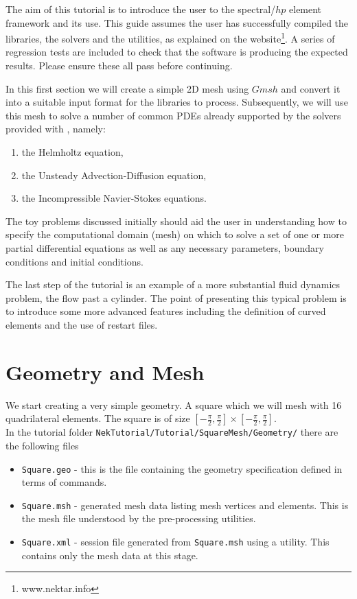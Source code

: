 \documentclass[a4paper,12pt]{article}
\begin{document}
\maketitle

The aim of this tutorial is to introduce the user to the spectral/$hp$
element framework \nektar and its use. This guide assumes
the user has successfully compiled the libraries, the solvers and the utilities,
as explained on the website\footnote{www.nektar.info}. A series of regression
tests are included to check that the software is producing the expected results.
Please ensure these all pass before continuing.
\bigskip

In this first section we will create a simple 2D mesh using $Gmsh$ and
convert it into a suitable input format for the \nektar
libraries to process. Subsequently, we will use this mesh to solve a number of
common PDEs already supported by the solvers provided with \nektar, namely:
\begin{enumerate}
\item the Helmholtz equation,
\item the Unsteady Advection-Diffusion equation,
\item the Incompressible Navier-Stokes equations. 
\end{enumerate}

The toy problems discussed initially should aid the user in understanding how to
specify the computational domain (mesh) on which to solve a set of one or more
partial differential equations as well as any necessary parameters, boundary
conditions and initial conditions.

The last step of the tutorial is an example of a more substantial fluid
dynamics problem, the flow past a cylinder. The point of presenting this typical
problem is to introduce some more advanced features including the definition of
curved elements and the use of restart files.


\section{Geometry and Mesh}

We start creating a very simple geometry. A square which we will mesh with 16
quadrilateral elements.
The square is of size
$[-\frac{\pi}{2},\frac{\pi}{2}]\times[-\frac{\pi}{2},\frac{\pi}{2}]$.\\

In the tutorial folder \texttt{NekTutorial/Tutorial/SquareMesh/Geometry/} there
are the following files
\begin{itemize}
\item \texttt{Square.geo} - this is the file containing the geometry
specification defined in terms of \gmsh commands.
\item \texttt{Square.msh} - \gmsh generated mesh data listing mesh vertices and
elements. This is the mesh file understood by the \nektar pre-processing
utilities.
\item \texttt{Square.xml} - \nektar session file generated from
\texttt{Square.msh} using a \nektar utility. This contains only the mesh data at
this stage.
\end{itemize}
\end{document}
